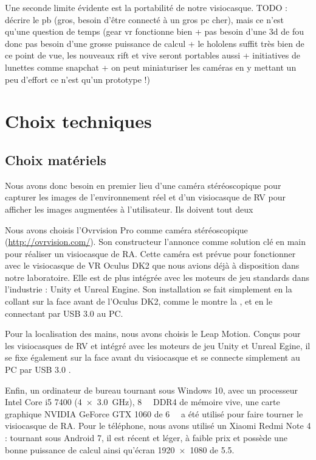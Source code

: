 Une seconde limite évidente est la portabilité de notre visiocasque.
TODO : décrire le pb (gros, besoin d'être connecté à un gros pc cher), mais ce n'est qu'une question de temps (gear vr fonctionne bien + pas besoin d'une 3d de fou donc pas besoin d'une grosse puissance de calcul + le hololens suffit très bien de ce point de vue, les nouveaux rift et vive seront portables aussi + initiatives de lunettes comme snapchat + on peut miniaturiser les caméras en y mettant un peu d'effort ce n'est qu'un prototype !)


\section{Choix techniques}
\label{sec:technical_choices}

\subsection{Choix matériels}
\label{subsec:hardware_choices}
Nous avons donc besoin en premier lieu d'une caméra stéréoscopique  pour capturer les images de l'environnement réel et d'un visiocasque de RV pour afficher les images augmentées à l'utilisateur. Ils doivent tout deux 

Nous avons choisis l'Ovrvision Pro comme caméra stéréoscopique (\url{http://ovrvision.com/}). Son constructeur l'annonce comme solution clé en main pour réaliser un visiocasque de RA. Cette caméra est prévue pour fonctionner avec le visiocasque de VR Oculus DK2 que nous avions déjà à disposition dans notre laboratoire. Elle est de plus intégrée avec les moteurs de jeu standards dans l'industrie : Unity et Unreal Engine. Son installation se fait simplement en la collant sur la face avant de l'Oculus DK2, comme le montre la , et en le connectant par USB 3.0 au PC.

Pour la localisation des mains, nous avons choisis le Leap Motion. Conçus pour les visiocasques de RV et intégré avec les moteurs de jeu Unity et Unreal Egine, il se fixe également sur la face avant du visiocasque et se connecte simplement au PC par USB 3.0 .

Enfin, un ordinateur de bureau tournant sous Windows 10, avec un processeur Intel Core i5 7400 (\SI[product-units = single]{4x3.0}{\GHz}), \SI{8}{\giga\byte} DDR4 de mémoire vive, une carte graphique NVIDIA GeForce GTX 1060 de \SI{6}{\giga\byte} a été utilisé pour faire tourner le visiocasque de RA. Pour le téléphone, nous avons utilisé un Xiaomi Redmi Note 4 : tournant sous Android 7, il est récent et léger, à faible prix et possède une bonne puissance de calcul ainsi qu'écran \SI{1920x1080}{\px} de \SI{5.5}{\inch}.

